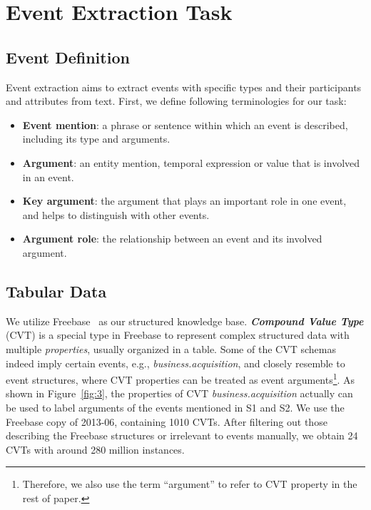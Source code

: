 \section{Event Extraction Task}
\subsection{Event Definition}
Event extraction aims to extract events with specific types and their participants and attributes from text. First, we define following terminologies for our task:
\begin{itemize}
	\item \textbf{Event mention}: a phrase or sentence within which an event is described, including its type and arguments.
	\item \textbf{Argument}: an entity mention, temporal expression or value that is involved in an event.
	\item \textbf{Key argument}: the argument that plays an important role in one event, and helps to distinguish with other events. %
	\item \textbf{Argument role}: the relationship between an event and its involved argument. 
\end{itemize}

\subsection{Tabular Data}
We utilize Freebase~\cite{bollacker2008freebase} as our structured knowledge base.
\textbf{\emph{Compound Value Type}} (CVT) is a special type in Freebase to represent complex structured data %
with multiple \emph{properties}, usually organized in a table. Some of the CVT schemas indeed imply certain events, e.g., \emph{business.acquisition},
and closely resemble to event structures, where CVT properties can be treated as event arguments\footnote{
Therefore, we also use the term ``argument'' to refer to CVT property in the rest of paper.}. %
As shown in Figure~\ref{fig:3}, the properties of CVT \emph{business.acquisition} actually can be used to label arguments of the events mentioned in S1 and S2. 
We use the Freebase copy of 2013-06,  %
containing 1010 CVTs. After filtering out those %
describing the Freebase structures or irrelevant to events %
manually, we obtain 24 CVTs with around 280 million instances.

